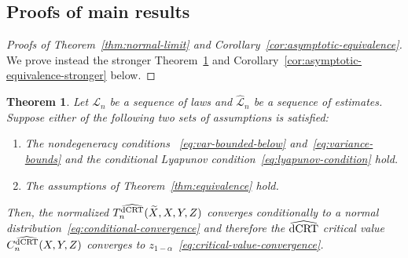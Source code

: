 \documentclass[aos]{imsart}
\newtheorem{theorem}{Theorem}
\theoremstyle{definition}
\theoremstyle{remark}
\newcommand{\srx}{X}									%
\newcommand{\srz}{Z}									%
\newcommand{\srxk}{\widetilde X}						%
\newcommand{\sry}{Y}									%
\newcommand{\law}{\mathcal L}							%
\newcommand{\lawhat}{\widehat{\mathcal L}}				%
\newcommand{\dCRThat}{\widehat{\textnormal{dCRT}}}		%
\begin{document}
\subsection{Proofs of main results}

\begin{proof}[Proofs of Theorem~\ref{thm:normal-limit} and Corollary~\ref{cor:asymptotic-equivalence}] 
We prove instead the stronger Theorem~\ref{thm:normal-limit-stronger} and Corollary~\ref{cor:asymptotic-equivalence-stronger} below.
\end{proof}

\begin{theorem} \label{thm:normal-limit-stronger}
	Let $\law_n$ be a sequence of laws and $\lawhat_n$ be a sequence of estimates. Suppose either of the following two sets of assumptions is satisfied: 
	\begin{enumerate}
		\item The nondegeneracy conditions ~\eqref{eq:var-bounded-below} and~\eqref{eq:variance-bounds} and the conditional Lyapunov condition~\eqref{eq:lyapunov-condition} hold.
		\item The assumptions of Theorem~\ref{thm:equivalence} hold.
	\end{enumerate}
	Then, the normalized $T_n^{\dCRThat}(\srxk, \srx, \sry, \srz)$ converges conditionally to a normal distribution~\eqref{eq:conditional-convergence} and therefore the $\dCRThat$ critical value $C^{\dCRThat}_n(\srx, \sry, \srz)$ converges to $z_{1-\alpha}$~\eqref{eq:critical-value-convergence}.
\end{theorem}
\end{document}
